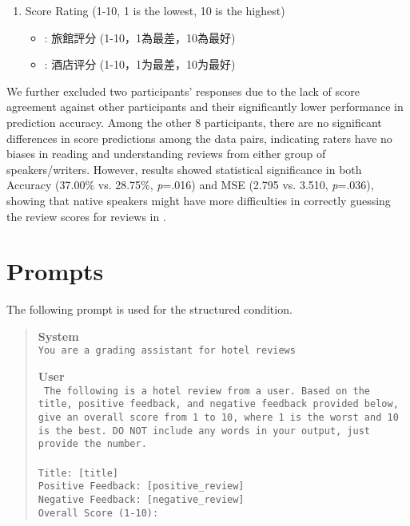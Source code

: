 \begin{enumerate}
    \item Score Rating (1-10, 1 is the lowest, 10 is the highest)
    \begin{itemize}[leftmargin=*]
        \item \begin{CJK*}{UTF8}{bsmi} \twChinese: 旅館評分 (1-10，1為最差，10為最好)
        \end{CJK*}
        \item \begin{CJK*}{UTF8}{gbsn} \cnChinese: 酒店评分 (1-10，1为最差，10为最好)
        \end{CJK*}
    \end{itemize}
\end{enumerate}

We further excluded two participants' responses due to the lack of score agreement against other participants and their significantly lower performance in prediction accuracy. Among the other 8 participants, there are no significant differences in score predictions among the data pairs, indicating raters have no biases in reading and understanding reviews from either group of speakers/writers. However, results showed statistical significance in both Accuracy (37.00\% vs. 28.75\%, \textit{p}=.016) and MSE (2.795 vs. 3.510, \textit{p}=.036), showing that native speakers might have more difficulties in correctly guessing the review scores for reviews in \twChinese. 

\section{Prompts\label{app:prompts}}

The following prompt is used for the structured condition.
\begin{quote}
    \small
    \textbf{System} \\
    \texttt{You are a grading assistant for hotel reviews}

    \textbf{User} \\
    \texttt{
        The following is a hotel review from a user. Based on the title, positive feedback, and negative feedback provided below, give an overall score from 1 to 10, where 1 is the worst and 10 is the best. DO NOT include any words in your output, just provide the number. \\ \\
        Title: [title] \\
        Positive Feedback: [positive\_review] \\
        Negative Feedback: [negative\_review] \\
        Overall Score (1-10):
    }
\end{quote}

